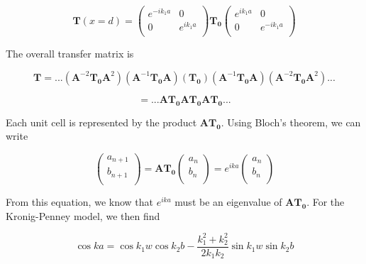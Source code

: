 \begin{equation}
\mathbf{T}(x = d) = 
	\begin{pmatrix}
		e^{-i k_{1} a} & 0 \\
		0 & e^{i k_{1} a}  \\
	\end{pmatrix}
	\mathbf{T_{0}}
	\begin{pmatrix}
		e^{i k_{1} a} & 0 \\
		0 & e^{-i k_{1} a}  \\
	\end{pmatrix}
\end{equation}

The overall transfer matrix is

\begin{equation}
\mathbf{T} = ...(\mathbf{A}^{-2}\mathbf{T_{0}} \mathbf{A}^{2})(\mathbf{A}^{-1}\mathbf{T_{0}} \mathbf{A})(\mathbf{T_{0}})(\mathbf{A}^{-1}\mathbf{T_{0}} \mathbf{A})(\mathbf{A}^{-2}\mathbf{T_{0}} \mathbf{A}^{2})...
\end{equation}

\begin{equation*}
= ... \mathbf{A}\mathbf{T_{0}}\mathbf{A}\mathbf{T_{0}}\mathbf{A}\mathbf{T_{0}}...
\end{equation*}

Each unit cell is represented by the product $\mathbf{A}\mathbf{T_{0}}$. Using Bloch's theorem, we can write

\begin{equation}
	\begin{pmatrix}
		a_{n+1} \\
		b_{n+1} \\
	\end{pmatrix} =
	\mathbf{AT_{0}}
	\begin{pmatrix}
		a_{n} \\
		b_{n} \\
	\end{pmatrix} = 
	e^{i k a}
	\begin{pmatrix}
		a_{n} \\
		b_{n} \\
	\end{pmatrix}
\end{equation}

From this equation, we know that $e^{i k a}$ must be an eigenvalue of $\mathbf{AT_{0}}$. For the Kronig-Penney model, we then find

\begin{equation}
\cos{k a} = \cos{k_{1} w} \cos{k_{2} b} - \frac{k_{1}^{2} + k_{2}^{2}}{2 k_{1} k_{2}} \sin{k_{1} w} \sin{k_{2} b}
\end{equation}

